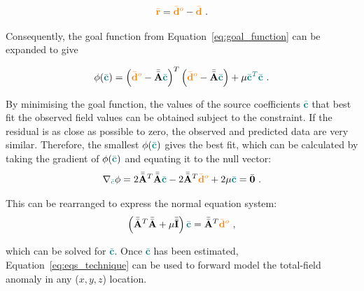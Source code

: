 \begin{equation}
    \label{eqs:resdiual}
    \textcolor{orange}{\bar{\mathbf{r}}} = \textcolor{orange}{\bar{\mathbf{d}}^o} - \textcolor{orange}{\bar{\mathbf{d}}}
    \ .
\end{equation}

\noindent
Consequently, the goal function from Equation~\ref{eq:goal_function} can  be expanded to give

\begin{equation}
    \phi (\textcolor{teal}{\bar{\mathbf{c}}}) = \left(\textcolor{orange}{\bar{\mathbf{d}}^o} - \Bar{\Bar{\mathbf{A}}} \textcolor{teal}{\bar{\mathbf{c}}}\right)^T \left(\textcolor{orange}{\bar{\mathbf{d}}^o} - \Bar{\Bar{\mathbf{A}}} \textcolor{teal}{\bar{\mathbf{c}}}\right) + \mu \textcolor{teal}{\bar{\mathbf{c}}^T\bar{\mathbf{c}}}
    \ .
\end{equation}

\noindent
By minimising the goal function, the values of the source coefficients \textcolor{teal}{$\bar{\mathbf{c}}$} that best fit the observed field values can be obtained subject to the constraint. If the residual is as close as possible to zero, the observed and predicted data are very similar. Therefore, the smallest $\phi(\textcolor{teal}{\bar{\mathbf{c}}})$ gives the best fit, which can be calculated by taking the gradient of $\phi(\textcolor{teal}{\bar{\mathbf{c}}})$ and equating it to the null vector:
\begin{equation}
    \nabla_{\textcolor{teal}{\bar{c}}} \phi = 2 \Bar{\Bar{\mathbf{A}}}^T \Bar{\Bar{\mathbf{A}}} \textcolor{teal}{\Bar{\mathbf{c}}} - 2\Bar{\Bar{\mathbf{A}}}^T\textcolor{orange}{\bar{\mathbf{d}}^o} + 2\mu \textcolor{teal}{\bar{\mathbf{c}}} = \bar{\mathbf{0}}
    \ .
\end{equation}

\noindent
This can be rearranged to express the normal equation system:
\begin{equation}
    \left( \Bar{\Bar{\mathbf{A}}}^T \Bar{\Bar{\mathbf{A}}} +  \mu \bar{\bar{\mathbf{I}}} \right) \textcolor{teal}{\bar{\mathbf{c}}} = 
    \Bar{\Bar{\mathbf{A}}}^T\textcolor{orange}{\bar{\mathbf{d}}^o}
    \ ,
    \label{eq:normal_equations}
\end{equation}

\noindent
which can be solved for \textcolor{teal}{$\bar{\mathbf{c}}$}. Once \textcolor{teal}{$\bar{\mathbf{c}}$} has been estimated, Equation~\ref{eq:eqs_technique} can be used to forward model the total-field anomaly in any ($x, y, z$) location.


